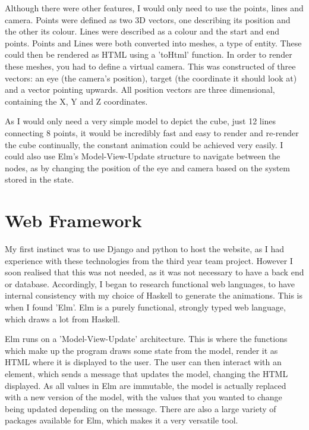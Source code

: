 \documentclass{l4proj}
\begin{document}
Although there were other features, I would only need to use the points, lines and camera.  Points were defined as two 3D vectors, one describing its position and the other its colour.  Lines were described as a colour and the start and end points.  Points and Lines were both converted into meshes, a type of entity.  These could then be rendered as HTML using a 'toHtml' function.  In order to render these meshes, you had to define a virtual camera.  This was constructed of three vectors: an eye (the camera's position), target (the coordinate it should look at) and a vector pointing upwards.  All position vectors are three dimensional, containing the X, Y and Z coordinates.

As I would only need a very simple model to depict the cube, just 12 lines connecting 8 points, it would be incredibly fast and easy to render and re-render the cube continually, the constant animation could be achieved very easily.  I could also use Elm's Model-View-Update structure to navigate between the nodes, as by changing the position of the eye and camera based on the system stored in the state.

\section{Web Framework}

My first instinct was to use Django and python to host the website, as I had experience with these technologies from the third year team project.  However I soon realised that this was not needed, as it was not necessary to have a back end or database.  Accordingly, I began to research functional web languages, to have internal consistency with my choice of Haskell to generate the animations.  This is when I found 'Elm'.  Elm is a purely functional, strongly typed web language, which draws a lot from Haskell.

Elm runs on a 'Model-View-Update' architecture.  This is where the functions which make up the program draws some state from the model, render it as HTML where it is displayed to the user.  The user can then interact with an element, which sends a message that updates the model, changing the HTML displayed.  As all values in Elm are immutable, the model is actually replaced with a new version of the model, with the values that you wanted to change being updated depending on the message.  There are also a large variety of packages available for Elm, which makes it a very versatile tool.
\end{document}
